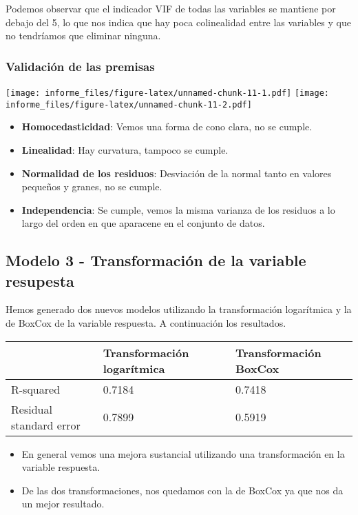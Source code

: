 \documentclass[
]{article}
\providecommand{\tightlist}{%
  \setlength{\itemsep}{0pt}\setlength{\parskip}{0pt}}
\begin{document}
Podemos observar que el indicador VIF de todas las variables se mantiene
por debajo del 5, lo que nos indica que hay poca colinealidad entre las
variables y que no tendríamos que eliminar ninguna.

\hypertarget{validaciuxf3n-de-las-premisas}{%
\subsubsection{Validación de las
premisas}\label{validaciuxf3n-de-las-premisas}}

\texttt{[image: informe\_files/figure-latex/unnamed-chunk-11-1.pdf]}
\texttt{[image: informe\_files/figure-latex/unnamed-chunk-11-2.pdf]}

\begin{itemize}
\tightlist
\item
  \textbf{Homocedasticidad}: Vemos una forma de cono clara, no se
  cumple.
\item
  \textbf{Linealidad}: Hay curvatura, tampoco se cumple.
\item
  \textbf{Normalidad de los residuos}: Desviación de la normal tanto en
  valores pequeños y granes, no se cumple.
\item
  \textbf{Independencia}: Se cumple, vemos la misma varianza de los
  residuos a lo largo del orden en que aparacene en el conjunto de
  datos.
\end{itemize}

\hypertarget{modelo-3---transformaciuxf3n-de-la-variable-resupesta}{%
\subsection{Modelo 3 - Transformación de la variable
resupesta}\label{modelo-3---transformaciuxf3n-de-la-variable-resupesta}}

Hemos generado dos nuevos modelos utilizando la transformación
logarítmica y la de BoxCox de la variable respuesta. A continuación los
resultados.

\begin{longtable}[]{@{}lll@{}}
\toprule
& Transformación logarítmica & Transformación BoxCox\tabularnewline
\midrule
\endhead
R-squared & 0.7184 & 0.7418\tabularnewline
Residual standard error & 0.7899 & 0.5919\tabularnewline
\bottomrule
\end{longtable}

\begin{itemize}
\tightlist
\item
  En general vemos una mejora sustancial utilizando una transformación
  en la variable respuesta.
\item
  De las dos transformaciones, nos quedamos con la de BoxCox ya que nos
  da un mejor resultado.
\end{itemize}
\end{document}
